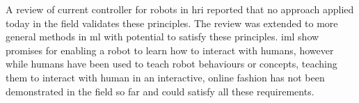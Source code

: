 A review of current controller for robots in \gls{hri} reported that no approach applied today in the field validates these principles. The review was extended to more general methods in \acrlong{ml} with potential to satisfy these principles. \acrlong{iml} show promises for enabling a robot to learn how to interact with humans, however while humans have been used to teach robot behaviours or concepts, teaching them to interact with human in an interactive, online fashion has not been demonstrated in the field so far and could satisfy all these requirements.